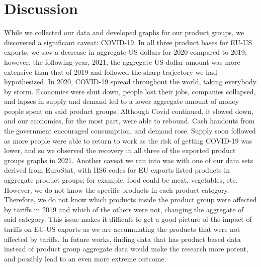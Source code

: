 \documentclass[12pt]{article}
\begin{document}
\section{Discussion}
\label{sec:discussion}
While we collected our data and developed graphs for our product groups, we discovered a significant caveat: COVID-19. In all three product bases for EU-US exports, we saw a decrease in aggregate US dollars for 2020 compared to 2019; however, the following year, 2021, the aggregate US dollar amount was more extensive than that of 2019 and followed the sharp trajectory we had hypothesized. In 2020, COVID-19 spread throughout the world, taking everybody by storm. Economies were shut down, people lost their jobs, companies collapsed, and lapses in supply and demand led to a lower aggregate amount of money people spent on said product groups. Although Covid continued, it slowed down, and our economies, for the most part, were able to rebound. Cash handouts from the government encouraged consumption, and demand rose. Supply soon followed as more people were able to return to work as the risk of getting COVID-19 was lower, and so we observed the recovery in all three of the exported product groups graphs in 2021.
Another caveat we ran into was with one of our data sets derived from EuroStat, with HS6 codes for EU exports listed products in aggregate product groups; for example, food could be meat, vegetables, etc.  However, we do not know the specific products in each product category. Therefore, we do not know which products inside the product group were affected by tariffs in 2019 and which of the others were not, changing the aggregate of said category. This issue makes it difficult to get a good picture of the impact of tariffs on EU-US exports as we are accumulating the products that were not affected by tariffs. In future works, finding data that has product based data instead of product group aggregate data would make the research more potent, and possibly lead to an even more extreme outcome. 
\end{document}
